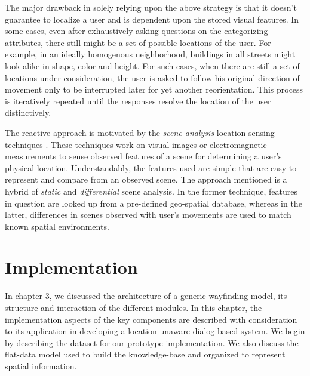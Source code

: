 \documentclass{iitkthesis}
\begin{document}
The major drawback in solely relying upon the above strategy is that it doesn't guarantee to localize a user and is dependent upon the stored visual features. In some cases, even after exhaustively asking questions on the categorizing attributes, there still might be a set of possible locations of the user. For example, in an ideally homogenous neighborhood, buildings in all streets might look alike in shape, color and height. For such cases, when there are still a set of locations under consideration, the user is asked to follow his original direction of movement only to be interrupted later for yet another reorientation. This process is iteratively repeated until the responses resolve the location of the user distinctively.

The reactive approach is motivated by the \textit{scene analysis} location sensing techniques \cite{hightower}. These techniques work on visual images or electromagnetic measurements to sense observed features of a scene for determining a user's physical location. Understandably, the features used are simple that are easy to represent and compare from an observed scene. The approach mentioned is a hybrid of \textit{static} and \textit{differential} scene analysis. In the former technique, features in question are looked up from a pre-defined geo-spatial database, whereas in the latter, differences in scenes observed with user's movements are used to match known spatial environments.

 \chapter{Implementation}
In chapter 3, we discussed the architecture of a generic wayfinding model, its structure and interaction of the different modules. In this chapter, the implementation aspects of the key components are described with consideration to its application in developing a location-unaware dialog based system. We begin by describing the dataset for our prototype implementation. We also discuss the flat-data model used to build the knowledge-base and organized to represent spatial information.
 
\end{document}
